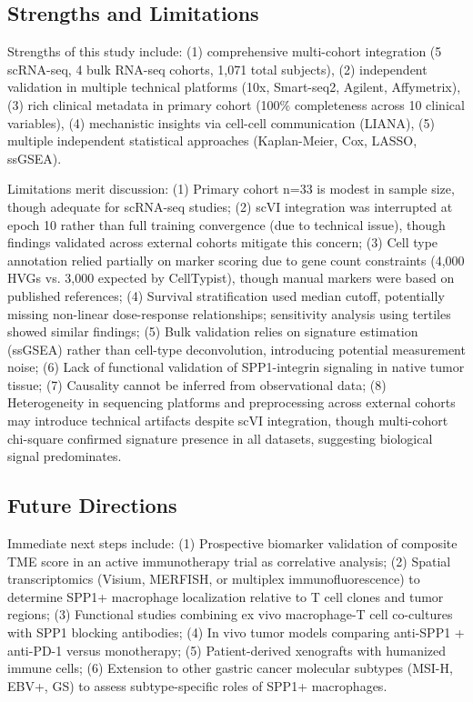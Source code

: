 \documentclass[12pt,twoside]{article}
\begin{document}
\subsection{Strengths and Limitations}

Strengths of this study include: (1) comprehensive multi-cohort integration (5 scRNA-seq, 4 bulk RNA-seq cohorts, 1,071 total subjects), (2) independent validation in multiple technical platforms (10x, Smart-seq2, Agilent, Affymetrix), (3) rich clinical metadata in primary cohort (100\% completeness across 10 clinical variables), (4) mechanistic insights via cell-cell communication (LIANA), (5) multiple independent statistical approaches (Kaplan-Meier, Cox, LASSO, ssGSEA).

Limitations merit discussion: (1) Primary cohort n=33 is modest in sample size, though adequate for scRNA-seq studies; (2) scVI integration was interrupted at epoch 10 rather than full training convergence (due to technical issue), though findings validated across external cohorts mitigate this concern; (3) Cell type annotation relied partially on marker scoring due to gene count constraints (4,000 HVGs vs. 3,000 expected by CellTypist), though manual markers were based on published references; (4) Survival stratification used median cutoff, potentially missing non-linear dose-response relationships; sensitivity analysis using tertiles showed similar findings; (5) Bulk validation relies on signature estimation (ssGSEA) rather than cell-type deconvolution, introducing potential measurement noise; (6) Lack of functional validation of SPP1-integrin signaling in native tumor tissue; (7) Causality cannot be inferred from observational data; (8) Heterogeneity in sequencing platforms and preprocessing across external cohorts may introduce technical artifacts despite scVI integration, though multi-cohort chi-square confirmed signature presence in all datasets, suggesting biological signal predominates.

\subsection{Future Directions}

Immediate next steps include: (1) Prospective biomarker validation of composite TME score in an active immunotherapy trial as correlative analysis; (2) Spatial transcriptomics (Visium, MERFISH, or multiplex immunofluorescence) to determine SPP1+ macrophage localization relative to T cell clones and tumor regions; (3) Functional studies combining ex vivo macrophage-T cell co-cultures with SPP1 blocking antibodies; (4) In vivo tumor models comparing anti-SPP1 + anti-PD-1 versus monotherapy; (5) Patient-derived xenografts with humanized immune cells; (6) Extension to other gastric cancer molecular subtypes (MSI-H, EBV+, GS) to assess subtype-specific roles of SPP1+ macrophages.
\end{document}
